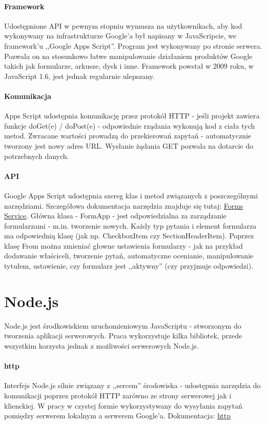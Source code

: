 \paragraph{Framework}
Udostępnione API w pewnym stopniu wymusza na użytkownikach, aby kod wykonywany na infrastrukturze Google'a był napisany w JavaScripcie, we framework'u ,,Google Apps Script''. Program jest wykonywany po stronie serwera. Pozwala on na stosunkowo łatwe manipulowanie działaniem produktów Google takich jak formularze, arkusze, dysk i inne. 
\ind Framework powstał w 2009 roku, w JavaScript 1.6, jest jednak regularnie ulepszany.

\paragraph{Komunikacja}
 Apps Script udostępnia komunikację przez protokół HTTP - jeśli projekt zawiera funkcje doGet(e) / doPost(e) - odpowiednie rządania wykonują kod z ciała tych metod. Zwracane wartości prowadzą do przekierowań zapytań  - automatycznie tworzony jest nowy adres URL. Wysłanie żądania GET pozwala na dotarcie do potrzebnych danych. 
\paragraph{API}
Google Apps Script udostępnia szereg klas i metod związanych z poszczególnymi narzędziami. Szczegółowa dokumentacja narzędzia znajduje się tutaj: \href{https://developers.google.com/apps-script/reference/forms}{Forms Service}.
 Główna klasa - FormApp - jest odpowiedzialna za zarządzanie formularzami - m.in. tworzenie nowych. Każdy typ pytania i element formularza ma odpowiednią klasę (jak np. CheckboxItem czy SectionHeaderItem). Poprzez klasę From  można zmieniać głowne ustawienia formularzy  - jak na przykład dodawanie właściceli, tworzenie pytań, automatyczne ocenianie, manipulowanie tytułem, ustawienie, czy formularz jest ,,aktywny'' (czy przyjmuje odpowiedzi).
 
 
\section{Node.js}
Node.js jest środkowiskiem uruchomieniowym JavaScriptu - stworzonym do tworzenia aplikacji serwerowych. 
Praca wykorzystuje kilka bibliotek, przede wszystkim korzysta jednak z możliwości serwerowych Node.js. 
\paragraph{http}
Interfejs Node.js silnie związany z ,,sercem'' środowiska - udostępnia narzędzia do komunikacji poprzez protokół  HTTP zarówno ze strony serwerowej jak i klienckiej. W pracy w czystej formie wykorzystywany do wysyłania zapytań pomiędzy serwerem lokalnym a serwerem Google'a.
\newline Dokumentacja: \href{https://nodejs.org/api/http.html}{http}
